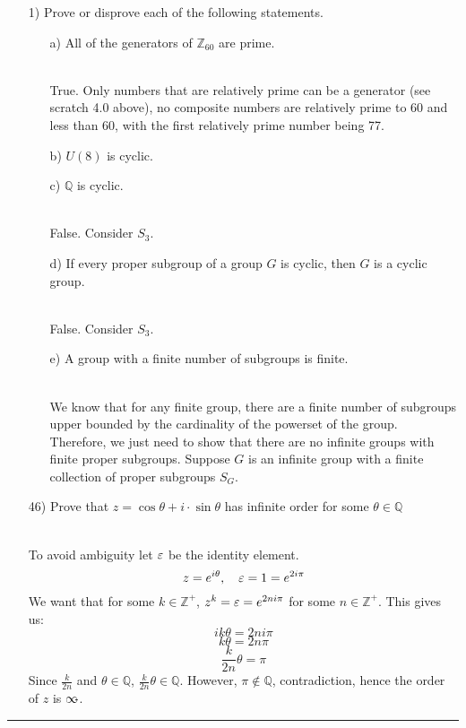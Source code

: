 \documentclass[11pt]{article}
\let\oriinfty=\infty
\def\infty{{\oriinfty\llap{\vrule height.24em depth-.2em width.2em}}}
\begin{document}
\begin{itemize}
    \item[1)] Prove or disprove each of the following statements.
    \begin{itemize}
        \item [a)]All of the generators of $\mathbb{Z}_{60}$ are prime.
        \begin{solution} \hfill \\
            True. Only numbers that are relatively prime can be a generator (see scratch 4.0 above), no composite numbers are relatively prime to 60 and less than 60, with the first relatively prime number being 77.
        \end{solution}
        \item [b)] $U(8)$ is cyclic.
        \item [c)]$\mathbb{Q}$ is cyclic.
        \begin{solution} \hfill \\
            False. Consider $S_3$.
        \end{solution}
        \item [d)]If every proper subgroup of a group $G$ is cyclic, then $G$ is a cyclic group.
        \begin{solution} \hfill \\
            False. Consider $S_3$.
        \end{solution}
        \item [e)]A group with a finite number of subgroups is finite.
        \begin{solution} \hfill \\
            We know that for any finite group, there are a finite number of subgroups upper bounded by the cardinality of the powerset of the group.\\
            Therefore, we just need to show that there are no infinite groups with finite proper subgroups. Suppose $G$ is an infinite group with a finite collection of proper subgroups $S_G$.
        \end{solution}

    \end{itemize}
    \item[46)] Prove that $z=\cos\theta + i\cdot \sin\theta$ has infinite order for some $\theta \in \mathbb{Q}$\\
    \begin{solution} \hfill \\
        To avoid ambiguity let $\varepsilon$ be the identity element.
        $$z=e^{i\theta}, \quad \varepsilon=1=e^{2i\pi}$$
        We want that for some $k\in \mathbb{Z}^+$, $z^k=\varepsilon=e^{2ni\pi}$ for some $n\in \mathbb{Z}^+$. This gives us:
        $$ik\theta=2ni\pi$$
        $$k\theta=2n\pi$$
        $$\frac{k}{2n}\theta=\pi$$
        Since $\frac{k}{2n}$ and $\theta \in \mathbb{Q}$, $\frac{k}{2n}\theta \in \mathbb{Q}$. However, $\pi \notin \mathbb{Q}$, contradiction,
        hence the order of $z$ is $\infty$.
    \end{solution}
\end{itemize}
\vspace{6pt}
\hrule
\vspace{6pt}
\end{document}
